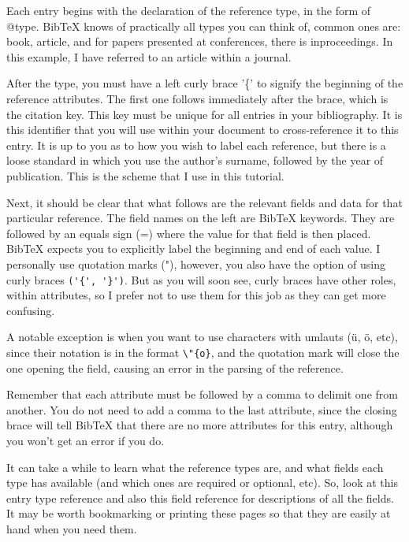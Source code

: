 Each entry begins with the declaration of the reference type, in the form of @type. BibTeX knows of practically all types you can think of, common ones are: book, article, and for papers presented at conferences, there is inproceedings. In this example, I have referred to an article within a journal.

After the type, you must have a left curly brace '\{' to signify the beginning of the reference attributes. The first one follows immediately after the brace, which is the citation key. This key must be unique for all entries in your bibliography. It is this identifier that you will use within your document to cross-reference it to this entry. It is up to you as to how you wish to label each reference, but there is a loose standard in which you use the author's surname, followed by the year of publication. This is the scheme that I use in this tutorial.

Next, it should be clear that what follows are the relevant fields and data for that particular reference. The field names on the left are BibTeX keywords. They are followed by an equals sign (=) where the value for that field is then placed. BibTeX expects you to explicitly label the beginning and end of each value. I personally use quotation marks ("), however, you also have the option of using curly braces \verb+('{', '}')+. But as you will soon see, curly braces have other roles, within attributes, so I prefer not to use them for this job as they can get more confusing. 

A notable exception is when you want to use characters with umlauts (ü, ö, etc), since their notation is in the format \verb+\"{o}+, and the quotation mark will close the one opening the field, causing an error in the parsing of the reference.

Remember that each attribute must be followed by a comma to delimit one from another. You do not need to add a comma to the last attribute, since the closing brace will tell BibTeX that there are no more attributes for this entry, although you won't get an error if you do.

It can take a while to learn what the reference types are, and what fields each type has available (and which ones are required or optional, etc). So, look at this entry type reference and also this field reference for descriptions of all the fields. It may be worth bookmarking or printing these pages so that they are easily at hand when you need them.

